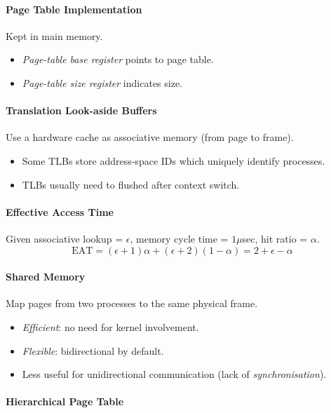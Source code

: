 \documentclass[twocolumn,english]{article}
\begin{document}
\paragraph{Page Table Implementation}

Kept in main memory.
\begin{itemize}
\item \emph{Page-table base register} points to page table.
\item \emph{Page-table size register} indicates size.
\end{itemize}

\paragraph{Translation Look-aside Buffers}

Use a hardware cache as associative memory (from page to frame).
\begin{itemize}
\item Some TLBs store address-space IDs which uniquely identify processes.
\item TLBs usually need to flushed after context switch.
\end{itemize}

\paragraph{Effective Access Time}

Given associative lookup = $\epsilon$, memory cycle time = $1\mu$sec,
hit ratio = $\alpha$.
\[
\text{EAT}=(\epsilon+1)\alpha+\left(\epsilon+2\right)\left(1-\alpha\right)=2+\epsilon-\alpha
\]

\paragraph{Shared Memory}

Map pages from two processes to the same physical frame.
\begin{itemize}
\item \emph{Efficient}: no need for kernel involvement.
\item \emph{Flexible}: bidirectional by default.
\item Less useful for unidirectional communication (lack of \emph{synchronisation}).
\end{itemize}

\paragraph{Hierarchical Page Table}
\end{document}

